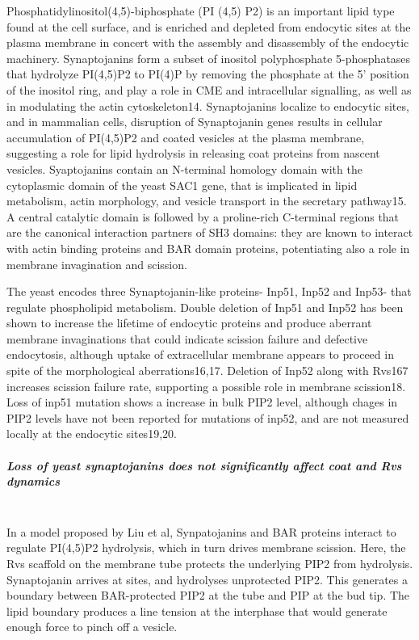 	\vspace{5mm}
	Phosphatidylinositol(4,5)-biphosphate (PI (4,5) P2) is an important lipid type found at the cell surface, and is enriched and depleted from endocytic sites at the plasma membrane in concert with the assembly and disassembly of the endocytic machinery. Synaptojanins form a subset of inositol polyphosphate 5-phosphatases that hydrolyze PI(4,5)P2 to PI(4)P by removing the phosphate at the 5’ position of the inositol ring, and play a role in CME and intracellular signalling, as well as in modulating the actin cytoskeleton14. Synaptojanins localize to endocytic sites, and in mammalian cells, disruption of Synaptojanin genes results in cellular accumulation of PI(4,5)P2 and coated vesicles at the plasma membrane, suggesting a role for lipid hydrolysis in releasing coat proteins from nascent vesicles. Syaptojanins contain an N-terminal homology domain with the cytoplasmic domain of the yeast SAC1 gene, that is implicated in lipid metabolism, actin morphology, and vesicle transport in the secretary pathway15. A central catalytic domain is followed by a proline-rich C-terminal regions that are the canonical interaction partners of SH3 domains: they are known to interact with actin binding proteins and BAR domain proteins, potentiating also a role in membrane invagination and scission. 
		
	\vspace{5mm}
	The yeast encodes three Synaptojanin-like proteins- Inp51, Inp52 and Inp53- that regulate phospholipid metabolism. Double deletion of Inp51 and Inp52 has been shown to increase the lifetime of endocytic proteins and produce aberrant membrane invaginations that could indicate scission failure and defective endocytosis, although uptake of extracellular membrane appears to proceed in spite of the morphological aberrations16,17. Deletion of Inp52 along with Rvs167 increases scission failure rate, supporting a possible role in membrane scission18. Loss of inp51 mutation shows a increase in bulk PIP2 level, although chages in PIP2 levels have not been reported for mutations of inp52, and are not measured locally at the endocytic sites19,20.

	\subparagraph{Loss of yeast synaptojanins does not significantly affect coat and Rvs dynamics}
	\mbox{}\\
	In a model proposed by Liu et al, Synpatojanins and BAR proteins interact to regulate PI(4,5)P2 hydrolysis, which in turn drives membrane scission. Here, the Rvs scaffold on the membrane tube protects the underlying PIP2 from hydrolysis. Synaptojanin arrives at sites, and hydrolyses unprotected PIP2. This generates a boundary between BAR-protected PIP2 at the tube and PIP at the bud tip. The lipid boundary produces a line tension at the interphase that would generate enough force to pinch off a vesicle. 
	
